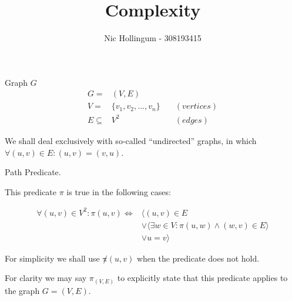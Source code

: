 \documentclass{article}
\author{Nic Hollingum - 308193415}
\title{Complexity}
\begin{document}
\begin{definition}
Graph $G$
\begin{align}
	\nonumber G = & (V,E) \\
	\nonumber V = & \{v_1, v_2, ..., v_n\} \quad & (vertices)\\
	\nonumber E \subseteq & V^2 & (edges)
\end{align}

We shall deal exclusively with so-called ``undirected'' graphs, in which $\forall (u,v) \in E : (u,v) = (v,u)$.
\end{definition}

\begin{definition}
Path Predicate.

This predicate $\pi$ is true in the following cases:

\begin{align}
	\nonumber \forall (u,v) \in V^2 : \pi(u, v) \Leftrightarrow & \langle (u, v) \in E \\
	\nonumber & \vee \langle \exists w \in V : \pi(u, w) \wedge (w, v) \in E \rangle \\
	\nonumber & \vee u = v \rangle
\end{align}

For simplicity we shall use $\not\pi(u, v)$ when the predicate does not hold.

For clarity we may say $\pi_{(V,E)}$ to explicitly state that this predicate applies to the graph $G=(V,E)$.

\end{definition}
\end{document}
